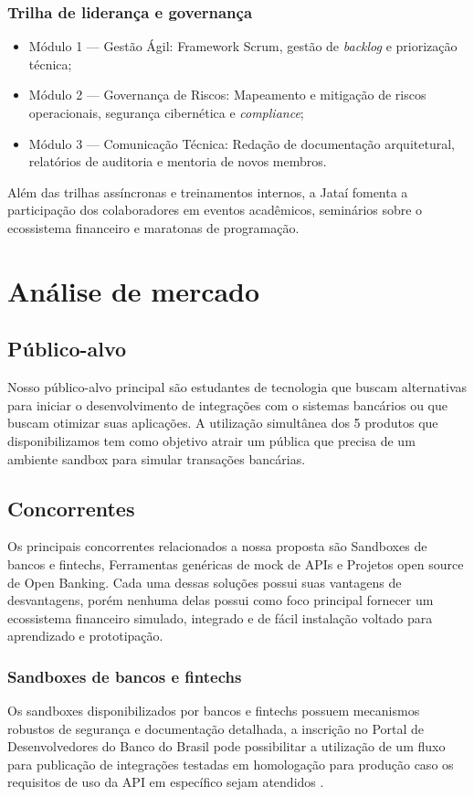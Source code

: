 \documentclass[
  12pt,
  openright,
  oneside,
  a4paper,
  brazilian
]{abntex2}
\begin{document}
\subsection{Trilha de liderança e governança}
\begin{itemize}
    \item{Módulo 1 — Gestão Ágil:} Framework Scrum, gestão de \textit{backlog} e priorização técnica;
    \item{Módulo 2 — Governança de Riscos:} Mapeamento e mitigação de riscos operacionais, segurança cibernética e \textit{compliance};
    \item{Módulo 3 — Comunicação Técnica:} Redação de documentação arquitetural, relatórios de auditoria e mentoria de novos membros.
\end{itemize}

\vspace{0.5em}
Além das trilhas assíncronas e treinamentos internos, a Jataí fomenta a participação dos colaboradores em eventos acadêmicos, seminários sobre o ecossistema financeiro e maratonas de programação.

\chapter{Análise de mercado}
\section{Público-alvo}
Nosso público-alvo principal são estudantes de tecnologia que buscam alternativas para iniciar o desenvolvimento de integrações com o sistemas bancários ou que buscam otimizar suas aplicações. A utilização simultânea dos 5 produtos que disponibilizamos tem como objetivo atrair um pública que precisa de um ambiente sandbox para simular transações bancárias.

\section{Concorrentes}
Os principais concorrentes relacionados a nossa proposta são Sandboxes de bancos e fintechs, Ferramentas genéricas de mock de APIs e Projetos open source de Open Banking. Cada uma dessas soluções possui suas vantagens de desvantagens, porém nenhuma delas possui como foco principal fornecer um ecossistema financeiro simulado, integrado e de fácil instalação voltado para aprendizado e prototipação.

\subsection{Sandboxes de bancos e fintechs}
Os sandboxes disponibilizados por bancos e fintechs possuem mecanismos robustos de segurança e documentação detalhada, a inscrição no Portal de Desenvolvedores do Banco do Brasil pode possibilitar a utilização de um fluxo para publicação de integrações testadas em homologação para produção caso os requisitos de uso da API em específico sejam atendidos \parencite{docBB}.
\end{document}
